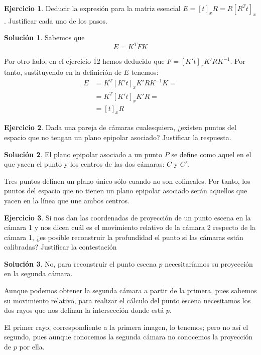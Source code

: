 \documentclass[a4paper, 11pt]{article}
\theoremstyle{definition}
\newtheorem{ejercicio}{Ejercicio}
\newtheorem*{solucion}{Solución}
\theoremstyle{theorem}
\begin{document}
    \begin{ejercicio}
        Deducir la expresión para la matriz esencial $E = [t]_x R = R[R^Tt]_x$. Justificar cada uno de los pasos.
    \end{ejercicio}

    \begin{solucion}
        Sabemos que
        \[
        E = K^T F K
        \]

        Por otro lado, en el ejercicio 12 hemos deducido que $F = [K't]_xK'RK^{-1}$. Por tanto, sustituyendo en la definición de $E$ tenemos:
        \begin{align*}
            E &= K^T [K't]_xK'RK^{-1} K = \\
            &= K^T [K't]_xK'R =\\
            &= [t]_x R
        \end{align*}
    \end{solucion}

    \begin{ejercicio}
        Dada una pareja de cámaras cualesquiera, ¿existen puntos del espacio que no tengan un plano epipolar asociado? Justificar la respuesta.
    \end{ejercicio}

    \begin{solucion}
        El plano epipolar asociado a un punto $P$ se define como aquel en el que yacen el punto y los centros de las dos cámaras: $C$ y $C'$.

        Tres puntos definen un plano único sólo cuando no son colineales. Por tanto, los puntos del espacio que no tienen un plano epipolar asociado serán aquellos que yacen en la línea que une ambos centros.
    \end{solucion}

    \begin{ejercicio}
        Si nos dan las coordenadas de proyección de un punto escena en la cámara 1 y nos dicen cuál es el movimiento relativo de la cámara 2 respecto de la cámara 1, ¿es posible reconstruir la profundidad el punto si las cámaras están calibradas? Justificar la contestación
    \end{ejercicio}

    \begin{solucion}
        No, para reconstruir el punto escena $p$ necesitaríamos su proyección en la segunda cámara.

        Aunque podemos obtener la segunda cámara a partir de la primera, pues sabemos su movimiento relativo, para realizar el cálculo del punto escena necesitamos los dos rayos que nos definan la intersección donde está $p$.

        El primer rayo, correspondiente a la primera imagen, lo tenemos; pero no así el segundo, pues aunque conocemos la segunda cámara no conocemos la proyección de $p$ por ella.
    \end{solucion}
\end{document}
